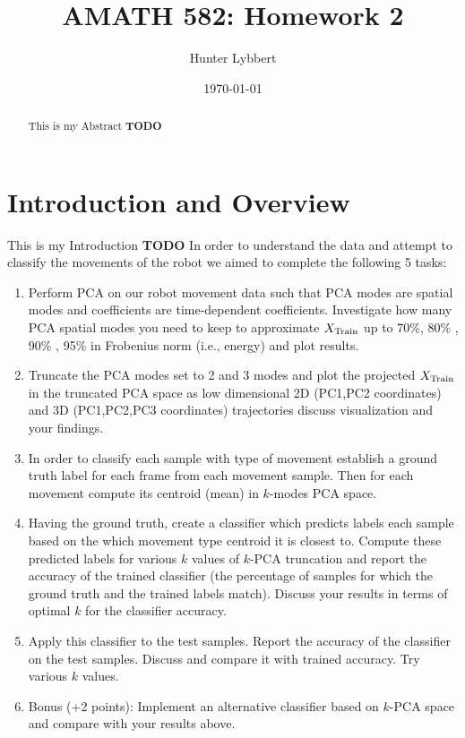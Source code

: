 \documentclass[11pt]{amsart}
\title{AMATH 582: Homework 2}
\author{Hunter Lybbert} %
\date{\today} %
\begin{document}
\maketitle

\begin{abstract}
    This is my Abstract \textbf{TODO}
\end{abstract}

\section{Introduction and Overview}\label{sec:Introduction}
This is my Introduction \textbf{TODO}
In order to understand the data and attempt to classify the movements of the robot we aimed to complete the following 5 tasks: \\
\begin{enumerate}

\item Perform PCA on our robot movement data such that PCA modes are spatial modes and coefficients are time-dependent coefficients.
Investigate how many PCA spatial modes you need to keep to approximate $X_{\rm Train}$ up to 70\%, 80\% , 90\% , 95\% in Frobenius norm (i.e., energy) and plot results. \\

\item Truncate the PCA modes set to 2 and 3 modes and plot the projected $X_{\rm Train}$ in the truncated PCA space as low dimensional 2D (PC1,PC2 coordinates) and 3D (PC1,PC2,PC3 coordinates) trajectories discuss visualization and your findings. \\

\item In order to classify each sample with type of movement establish a ground truth label for each frame from each movement sample.
Then for each movement compute its centroid (mean) in $k$-modes PCA space. \\

\item Having the ground truth, create a classifier which predicts labels each sample based on the which movement type centroid it is closest to.
Compute these predicted labels for various $k$ values of $k$-PCA truncation and report the accuracy of the trained classifier (the percentage of samples for which the ground truth and the trained labels match).
Discuss your results in terms of optimal $k$ for the classifier accuracy. \\

\item Apply this classifier to the test samples.
Report the accuracy of the classifier on the test samples.
Discuss and compare it with trained accuracy.
Try various $k$ values. \\

\item Bonus (+2 points): Implement an alternative classifier based on $k$-PCA space and compare with your
results above. \\

\end{enumerate}
\end{document}
